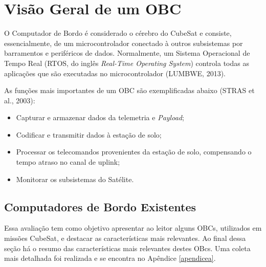 \section{Visão Geral de um OBC}

O Computador de Bordo é considerado o cérebro do CubeSat e consiste, essencialmente, de um microcontrolador conectado à outros subsistemas por barramentos  e periféricos de dados. Normalmente, um Sistema Operacional de Tempo Real (RTOS, do inglês \textit{Real-Time Operating System}) controla todas as aplicações que são executadas no microcontrolador (LUMBWE, 2013).

As funções mais importantes de um OBC são exemplificadas abaixo (STRAS et al., 2003):

\begin{itemize}
	
	\item Capturar e armazenar dados da telemetria e \textit{Payload};
	
	\item Codificar e transmitir dados à estação de solo;
	
	\item Processar os telecomandos provenientes da estação de solo, compensando o tempo atraso no canal de uplink;
	
	\item Monitorar os subsistemas do Satélite.
	
\end{itemize}

\subsection{Computadores de Bordo Existentes}

Essa avaliação tem como objetivo apresentar ao leitor alguns OBCs, utilizados em missões CubeSat, e destacar as características mais relevantes. Ao final dessa seção há o resumo das características mais relevantes destes OBcs. Uma coleta mais detalhada foi realizada e se encontra no Apêndice \ref{apendicea}.

